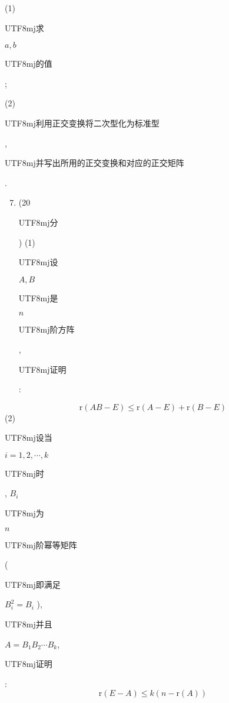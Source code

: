 \documentclass[10pt]{article}
\begin{document}
(1) \begin{CJK}{UTF8}{mj}求\end{CJK} $a, b$ \begin{CJK}{UTF8}{mj}的值\end{CJK};

(2) \begin{CJK}{UTF8}{mj}利用正交变换将二次型化为标准型\end{CJK}, \begin{CJK}{UTF8}{mj}并写出所用的正交变换和对应的正交矩阵\end{CJK}.

\begin{enumerate}
  \setcounter{enumi}{6}
  \item (20 \begin{CJK}{UTF8}{mj}分\end{CJK}) (1) \begin{CJK}{UTF8}{mj}设\end{CJK} $A, B$ \begin{CJK}{UTF8}{mj}是\end{CJK} $n$ \begin{CJK}{UTF8}{mj}阶方阵\end{CJK}, \begin{CJK}{UTF8}{mj}证明\end{CJK}:
\end{enumerate}
$$
\mathrm{r}(A B-E) \leq \mathrm{r}(A-E)+\mathrm{r}(B-E)
$$
(2) \begin{CJK}{UTF8}{mj}设当\end{CJK} $i=1,2, \cdots, k$ \begin{CJK}{UTF8}{mj}时\end{CJK}, $B_{i}$ \begin{CJK}{UTF8}{mj}为\end{CJK} $n$ \begin{CJK}{UTF8}{mj}阶幂等矩阵\end{CJK} (\begin{CJK}{UTF8}{mj}即满足\end{CJK} $B_{i}^{2}=B_{i}$ ), \begin{CJK}{UTF8}{mj}并且\end{CJK} $A=B_{1} B_{2} \cdots B_{k}$, \begin{CJK}{UTF8}{mj}证明\end{CJK}:
$$
\mathrm{r}(E-A) \leq k(n-\mathrm{r}(A))
$$
\end{document}
